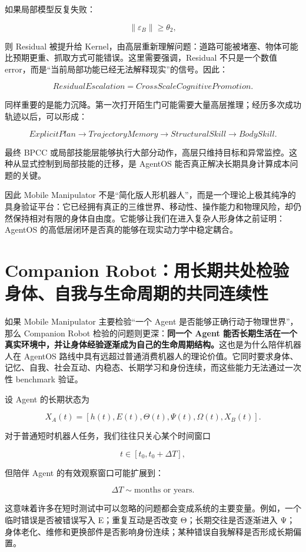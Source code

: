 如果局部模型反复失败：

$$
\|\varepsilon_B\|\geq\theta_2,
$$

则 Residual 被提升给 Kernel，由高层重新理解问题：道路可能被堵塞、物体可能比预期更重、抓取方式可能错误。这里需要强调，Residual 不只是一个数值 error，而是“当前局部功能已经无法解释现实”的信号。因此：

$$
\boxed{
ResidualEscalation
=
CrossScaleCognitivePromotion.
}
$$

同样重要的是能力沉降。第一次打开陌生门可能需要大量高层推理；经历多次成功轨迹以后，可以形成：

$$
ExplicitPlan
\rightarrow
TrajectoryMemory
\rightarrow
StructuralSkill
\rightarrow
BodySkill.
$$

最终 BPCC 或局部技能层能够执行大部分动作，高层只维持目标和异常监控。这种从显式控制到局部技能的迁移，是 AgentOS 能否真正解决长期具身计算成本问题的关键。

因此 Mobile Manipulator 不是“简化版人形机器人”，而是一个理论上极其纯净的具身验证平台：它已经拥有真正的三维世界、移动性、操作能力和物理风险，却仍然保持相对有限的身体自由度。它能够让我们在进入复杂人形身体之前证明：AgentOS 的高低层闭环是否真的能够在现实动力学中稳定耦合。

\section{Companion Robot：用长期共处检验身体、自我与生命周期的共同连续性}

如果 Mobile Manipulator 主要检验“一个 Agent 是否能够正确行动于物理世界”，那么 Companion Robot 检验的问题则更深：\textbf{同一个 Agent 能否长期生活在一个真实环境中，并让身体经验逐渐成为自己的生命周期结构。}这也是为什么陪伴机器人在 AgentOS 路线中具有远超过普通消费机器人的理论价值。它同时要求身体、记忆、自我、社会互动、内稳态、长期学习和身份连续，而这些能力无法通过一次性 benchmark 验证。

设 Agent 的长期状态为

$$
X_A(t)
=
[
h(t),E(t),\Theta(t),\Psi(t),\Omega(t),
X_B(t)
].
$$

对于普通短时机器人任务，我们往往只关心某个时间窗口

$$
t\in[t_0,t_0+\Delta T],
$$

但陪伴 Agent 的有效观察窗口可能扩展到：

$$
\Delta T
\sim
\text{months or years}.
$$

这意味着许多在短时测试中可以忽略的问题都会变成系统的主要变量。例如，一个临时错误是否被错误写入 E；重复互动是否改变 Θ；长期交往是否逐渐进入 Ψ；身体老化、维修和更换部件是否影响身份连续；某种错误自我解释是否形成长期偏置。

